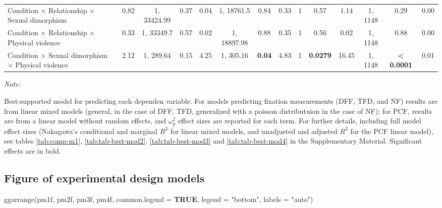 \documentclass[
  bookmarksnumbered]{article}
\newenvironment{Shaded}{\begin{snugshade}}{\end{snugshade}}
\newcommand{\AttributeTok}[1]{\textcolor[rgb]{0.80,0.80,0.80}{#1}}
\newcommand{\ConstantTok}[1]{\textcolor[rgb]{0.86,0.64,0.64}{\textbf{#1}}}
\newcommand{\FunctionTok}[1]{\textcolor[rgb]{0.94,0.94,0.56}{#1}}
\newcommand{\NormalTok}[1]{\textcolor[rgb]{0.80,0.80,0.80}{#1}}
\newcommand{\StringTok}[1]{\textcolor[rgb]{0.80,0.58,0.58}{#1}}
\begin{document}
\begin{table}[H]
{\begin{threeparttable}
\begin{tabular}[t]{lccccccccccccc}
Condition × Relationship × Sexual dimorphism & 0.82 & 1, 33424.99 & 0.37 & 0.04 & 1, 18761.5 & 0.84 & 0.33 & 1 & 0.57 & 1.14 & 1, 1148 & 0.29 & 0.00\\
Condition × Relationship × Physical violence & 0.33 & 1, 33349.7 & 0.57 & 0.02 & 1, 18897.98 & 0.88 & 0.35 & 1 & 0.56 & 0.02 & 1, 1148 & 0.88 & 0.00\\
Condition × Sexual dimorphism × Physical violence & 2.12 & 1, 289.64 & 0.15 & 4.25 & 1, 305.16 & \textbf{0.04} & 4.83 & 1 & \textbf{0.0279} & 16.45 & 1, 1148 & \textbf{< 0.0001} & 0.01\\
\bottomrule
\end{tabular}
\begin{tablenotes}[para]
\item \textit{Note: } 
\item Best-supported model for predicting each dependen variable. 
  For models predicting fixation measurements (DFF, TFD, and NF) results 
  are from linear mixed models (general, in the case of DFF, TFD, generalized with a poisson
  distributuion in the case of NF); for PCF, results are from a linear model without 
  random effects, and $\omega^2_p$ effect sizes are reported for each term. For further 
  details, including full model effect sizes (Nakagawa's conditional and marginal $R^2$ for 
  linear mixed models, and unadjusted and adjusted $R^2$ for the PCF linear model), 
  see tables \ref{tab:comp-m1}, \ref{tab:tab-best-mod2}, \ref{tab:tab-best-mod3} 
  and \ref{tab:tab-best-mod4} in the Supplementary Material. 
  Significant effects are in bold.
\end{tablenotes}
\end{threeparttable}}
\end{table}

\subsection{Figure of experimental design models}\label{figure-of-experimental-design-models-1}

\begin{Shaded}
\begin{Highlighting}[]
\FunctionTok{ggarrange}\NormalTok{(pm1f, pm2f, pm3f, pm4f,}
          \AttributeTok{common.legend =} \ConstantTok{TRUE}\NormalTok{,}
          \AttributeTok{legend =} \StringTok{"bottom"}\NormalTok{,}
          \AttributeTok{labels =} \StringTok{"auto"}\NormalTok{)}
\end{Highlighting}
\end{Shaded}
\end{document}
